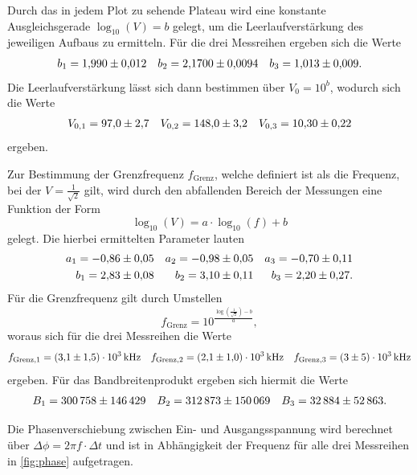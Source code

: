 Durch das in jedem Plot zu sehende Plateau wird eine konstante Ausgleichsgerade $\log_{10} (V) = b$ gelegt, um die Leerlaufverstärkung des jeweiligen Aufbaus zu ermitteln. Für die drei Messreihen ergeben sich die Werte
\begin{align*}
  b_1 = \num{1.99 \pm 0.012} && b_2 = \num{2.170 \pm 0.0094} && b_3 = \num{1.013 \pm 0.009}.
\end{align*}
Die Leerlaufverstärkung lässt sich dann bestimmen über $V_0 = 10^{b}$, wodurch sich die Werte
\begin{align*}
  V_{0,1} = \num{97 \pm 2.7} && V_{0,2} = \num{148 \pm 3.2} && V_{0,3} = \num{10.3 \pm 0.22}
\end{align*}
ergeben.

Zur Bestimmung der Grenzfrequenz $f_\mathrm{Grenz}$, welche definiert ist als die Frequenz, bei der $V = \frac{1}{\sqrt{2}}$ gilt, wird durch den abfallenden Bereich der Messungen eine Funktion der Form
\begin{equation*}
  \log_{10} (V) = a \cdot \log_{10} (f) + b
\end{equation*}
gelegt. Die hierbei ermittelten Parameter lauten
\begin{align*}
  a_1 = \num{-0.86 \pm 0.05} && a_2 = \num{-0.98 \pm 0.05} && a_3 = \num{-0.7 \pm 0.11}\\
  b_1 = \num{2.83 \pm 0.08} && b_2 = \num{3.1 \pm 0.11} && b_3 = \num{2.2 \pm 0.27}.
\end{align*}
Für die Grenzfrequenz gilt durch Umstellen
\begin{equation*}
  f_\mathrm{Grenz} = 10^{\frac{\log (\frac{1}{\sqrt{2}}) - b}{a}},
\end{equation*}
woraus sich für die drei Messreihen die Werte
\begin{align*}
  f_{\mathrm{Grenz},1} = \SI{3.1 \pm 1.5 e3}{\kilo\hertz} && f_{\mathrm{Grenz},2} = \SI{2.1 \pm 1.0 e3}{\kilo\hertz} && f_{\mathrm{Grenz},3} = \SI{3 \pm 5 e3}{\kilo\hertz}
\end{align*}
ergeben.
Für das Bandbreitenprodukt ergeben sich hiermit die Werte
\begin{align*}
  B_1 = \num{300758 \pm 146429} && B_2 = \num{312873 \pm 150069} && B_3 = \num{32884 \pm 52863}.
\end{align*}

Die Phasenverschiebung zwischen Ein- und Ausgangsspannung wird berechnet über $\Delta \phi = 2 \pi f \cdot \Delta t$ und ist in Abhängigkeit der Frequenz für alle drei Messreihen in \autoref{fig:phase} aufgetragen.

